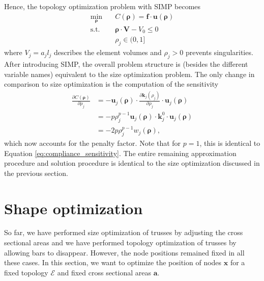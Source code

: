 Hence, the topology optimization problem with SIMP becomes  
\begin{equation}
    \begin{aligned}
        \min_{\pmb{\rho}} \quad & C(\pmb{\rho}) = \mathbf{f} \cdot \mathbf{u}(\pmb{\rho})\\
        \textrm{s.t.} \quad & \pmb{\rho} \cdot \mathbf{V} - V_0 \le 0  \\
                            & \rho_j \in (0, 1]
    \end{aligned}
\end{equation}
where $V_j=a_j l_j$ describes the element volumes and $\rho_j >0$ prevents singularities. After introducing SIMP, the overall problem structure is (besides the different variable names) equivalent to the size optimization problem. The only change in comparison to size optimization  is the computation of the sensitivity
\begin{align}
    \frac{\partial C (\pmb{\rho})}{\partial \rho_j} 
    &= - \mathbf{u}_j (\pmb{\rho}) \cdot \frac{\partial \mathbf{k}_j(\rho_j)}{\partial \rho_j} \cdot \mathbf{u}_j (\pmb{\rho})  \\
    &= - p \rho_j^{p-1} \mathbf{u}_j (\pmb{\rho}) \cdot \mathbf{k}^0_j \cdot \mathbf{u}_j (\pmb{\rho})  \\
    &= - 2 p \rho_j^{p-1} w_j (\pmb{\rho}),
\end{align}
which now accounts for the penalty factor. Note that for $p=1$, this is identical to Equation \eqref{eq:compliance_sensitivity}. 
The entire remaining approximation procedure and solution procedure is identical to the size optimization discussed in the previous section.

\section{Shape optimization}
So far, we have performed size optimization of trusses by adjusting the cross sectional areas and we have performed topology optimization of trusses by allowing bars to disappear. However, the node positions remained fixed in all these cases. 
In this section, we want to optimize the position of nodes $\mathbf{x}$ for a fixed topology $\mathcal{E}$ and fixed cross sectional areas $\mathbf{a}$.

